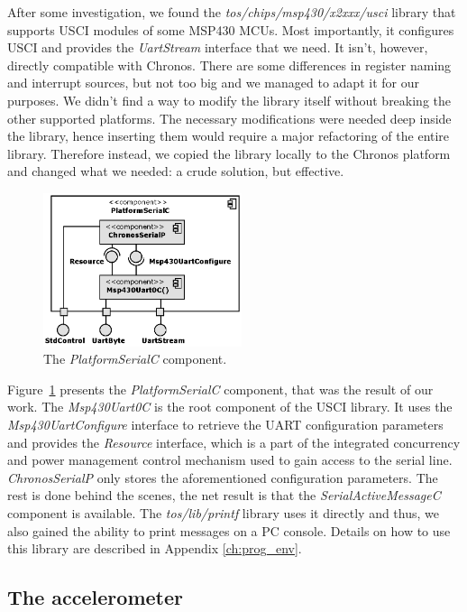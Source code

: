 After some investigation, we found the \emph{tos/chips/msp430/x2xxx/usci} library that supports USCI modules of some MSP430 MCUs. Most importantly, it configures USCI and provides the \emph{UartStream} interface that we need. It isn't, however, directly compatible with Chronos. There are some differences in register naming and interrupt sources, but not too big and we managed to adapt it for our purposes. We didn't find a way to modify the library itself without breaking the other supported platforms. The necessary modifications were needed deep inside the library, hence inserting them would require a major refactoring of the entire library. Therefore instead, we copied the library locally to the Chronos platform and changed what we needed: a crude solution, but effective.

\begin{figure}[h]
  \centering
  \includegraphics[width=0.52\textwidth]{diagrams/platform_serial_c.eps}
  \caption{The \emph{PlatformSerialC} component.}
  \label{fig:platform_serial_c}
\end{figure}

Figure~\ref{fig:platform_serial_c} presents the \emph{PlatformSerialC} component, that was the result of our work. The \emph{Msp430Uart0C} is the root component of the USCI library. It uses the \emph{Msp430UartConfigure} interface to retrieve the UART configuration parameters and provides the \emph{Resource} interface, which is a part of the integrated concurrency and power management control mechanism used to gain access to the serial line. \emph{ChronosSerialP} only stores the aforementioned configuration parameters. The rest is done behind the scenes, the net result is that the \emph{SerialActiveMessageC} component is available. The \emph{tos/lib/printf} library uses it directly and thus, we also gained the ability to print messages on a PC console. Details on how to use this library are described in Appendix \ref{ch:prog_env}.

\subsection{The accelerometer}
\label{ch:accelerometer}

